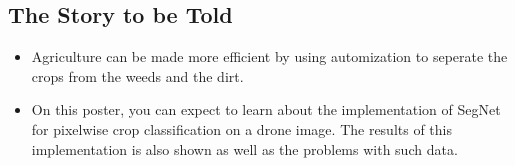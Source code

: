 \documentclass[
    ,title     = {{Image Segmentation for Smart Agriculture}}
    ,subject   = {{This is the subject of my work}}
    ,papersize = {{a1paper}}
    ,nocrop
]{dtuposter}
\begin{document}
%
%
\begin{dtuposterhead} %
\end{dtuposterhead}
%
%
\begin{dtupostercontent}
\section{The Story to be Told}
\begin{itemize}
	\item Agriculture can be made more efficient by using automization to seperate the crops from the weeds and the dirt.
	\item On this poster, you can expect to learn about the implementation of SegNet for pixelwise crop classification on a drone image. The results of this implementation is also shown as well as the problems with such data.
\end{itemize}
 

\end{dtupostercontent}
\end{document}
